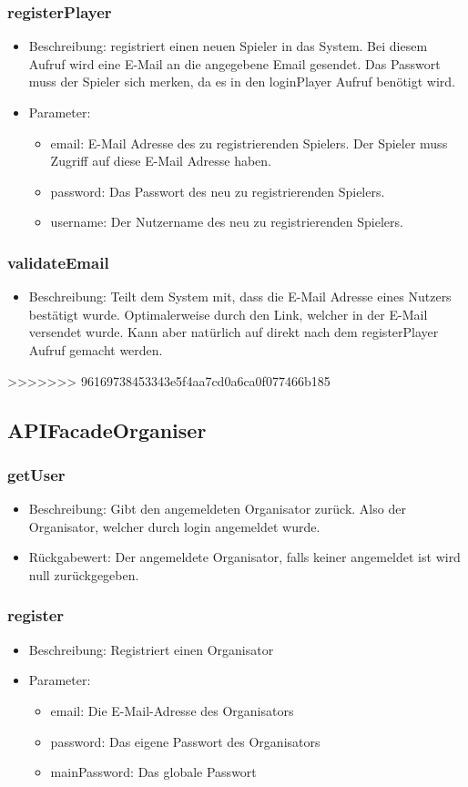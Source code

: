 \documentclass[a4paper]{scrreprt}
\begin{document}
	\subsubsection{registerPlayer}
	\begin{itemize}
		\item Beschreibung: registriert einen neuen Spieler in das System. Bei diesem Aufruf wird eine E-Mail an die angegebene Email gesendet. Das Passwort muss der Spieler sich merken, da es in den loginPlayer Aufruf benötigt wird.
		\item Parameter:
		\begin{itemize}
			\item email: E-Mail Adresse des zu registrierenden Spielers. Der Spieler muss Zugriff auf diese E-Mail Adresse haben.
			\item password: Das Passwort des neu zu registrierenden Spielers.
			\item username: Der Nutzername des neu zu registrierenden Spielers.
		\end{itemize}
	\end{itemize}
	\subsubsection{validateEmail}
	\begin{itemize}
		\item Beschreibung: Teilt dem System mit, dass die E-Mail Adresse eines Nutzers bestätigt wurde. Optimalerweise durch den Link, welcher in der E-Mail versendet wurde. Kann aber natürlich auf direkt nach dem registerPlayer Aufruf gemacht werden.
	\end{itemize}
>>>>>>> 96169738453343e5f4aa7cd0a6ca0f077466b185
	\subsection{APIFacadeOrganiser}
	\subsubsection{getUser}
		\begin{itemize}
			\item Beschreibung: Gibt den angemeldeten Organisator zurück. Also der Organisator, welcher durch login angemeldet wurde.
			\item Rückgabewert: Der angemeldete Organisator, falls keiner angemeldet ist wird null zurückgegeben.
		\end{itemize}
	\subsubsection{register}
	\begin{itemize}
		\item Beschreibung: Registriert einen Organisator
		\item Parameter:
		\begin{itemize}
		\item email: Die E-Mail-Adresse des Organisators
		\item password: Das eigene Passwort des Organisators
		\item mainPassword: Das globale Passwort
		\end{itemize}
		\end{itemize}
\end{document}
